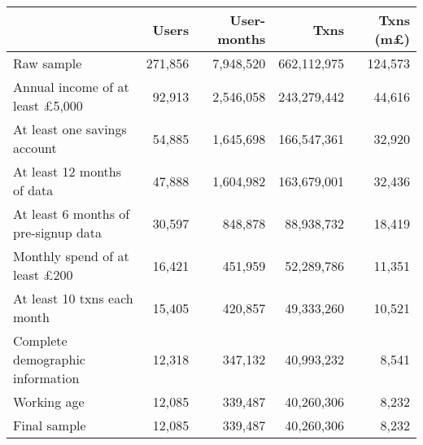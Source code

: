 \begin{tabular}{lrrrr}
\toprule
                                       &   Users & User-months &        Txns & Txns (m\pounds) \\
\midrule
                            Raw sample & 271,856 &   7,948,520 & 662,112,975 &         124,573 \\
Annual income of at least \pounds5,000 &  92,913 &   2,546,058 & 243,279,442 &          44,616 \\
          At least one savings account &  54,885 &   1,645,698 & 166,547,361 &          32,920 \\
            At least 12 months of data &  47,888 &   1,604,982 & 163,679,001 &          32,436 \\
  At least 6 months of pre-signup data &  30,597 &     848,878 &  88,938,732 &          18,419 \\
  Monthly spend of at least \pounds200 &  16,421 &     451,959 &  52,289,786 &          11,351 \\
           At least 10 txns each month &  15,405 &     420,857 &  49,333,260 &          10,521 \\
      Complete demographic information &  12,318 &     347,132 &  40,993,232 &           8,541 \\
                           Working age &  12,085 &     339,487 &  40,260,306 &           8,232 \\
                          Final sample &  12,085 &     339,487 &  40,260,306 &           8,232 \\
\bottomrule
\end{tabular}
